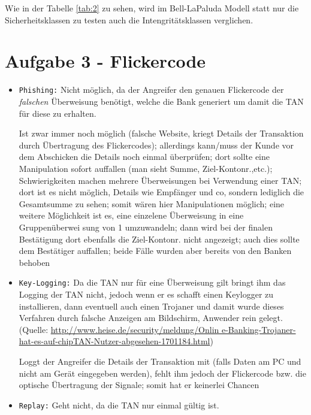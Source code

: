 \documentclass{scrartcl}
\begin{document}
Wie in der Tabelle \ref{tab:2} zu sehen, wird im Bell-LaPaluda Modell statt nur die Sicherheitsklassen zu testen auch die Intengritätsklassen verglichen.

\section*{Aufgabe 3 - Flickercode}

\begin{itemize}
\item \texttt{Phishing:} Nicht möglich, da der Angreifer den genauen Flickercode der \textit{falschen} Überweisung benötigt, welche die Bank generiert um damit die TAN für diese zu erhalten.  

Ist zwar immer noch möglich (falsche Website, kriegt Details der Transaktion durch Übertragung des Flickercodes);
allerdings kann/muss der Kunde vor dem Abschicken die Details noch einmal überprüfen; dort sollte eine Manipulation
sofort auffallen (man sieht Summe, Ziel-Kontonr.,etc.); Schwierigkeiten machen mehrere Überweisungen bei Verwendung
einer TAN; dort ist es nicht möglich, Details wie Empfänger und co, sondern lediglich die Gesamtsumme zu sehen; somit
wären hier Manipulationen möglich; eine weitere Möglichkeit ist es, eine einzelene Überweisung in eine Gruppenüberwei
sung von 1 umzuwandeln; dann wird bei der finalen Bestätigung dort ebenfalls die Ziel-Kontonr. nicht angezeigt; auch
dies sollte dem Bestätiger auffallen; beide Fälle wurden aber bereits von den Banken behoben

\item \texttt{Key-Logging:} Da die TAN nur für eine Überweisung gilt bringt ihm das Logging der TAN nicht, jedoch wenn
er es schafft einen Keylogger zu installieren, dann eventuell auch einen Trojaner und damit wurde dieses Verfahren
durch falsche Anzeigen am Bildschirm, Anwender rein gelegt. (Quelle: \url{http://www.heise.de/security/meldung/Onlin
e-Banking-Trojaner-hat-es-auf-chipTAN-Nutzer-abgesehen-1701184.html})

Loggt der Angreifer die Details der Transaktion mit (falls Daten am PC und nicht am Gerät eingegeben werden), fehlt ihm jedoch der Flickercode bzw. die optische Übertragung der Signale; somit hat er keinerlei Chancen
\item \texttt{Replay:} Geht nicht, da die TAN nur einmal gültig ist.


\end{itemize}
\end{document}
